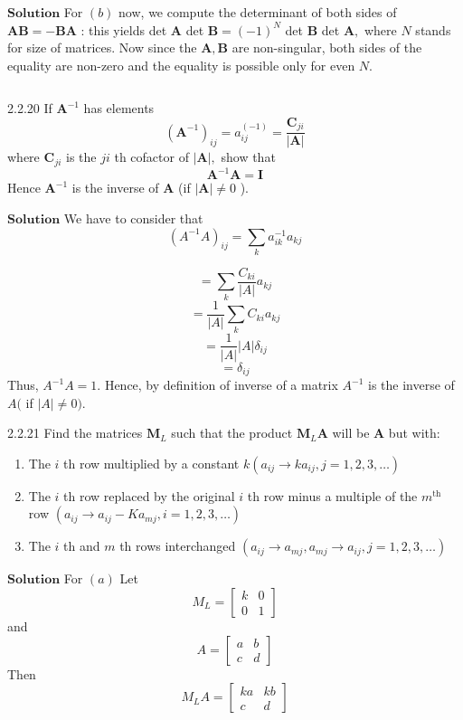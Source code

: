 $\boxed{\textbf{Solution}}$ For $(b)$ now, we compute the determinant of both sides of $\mathbf{A} \mathbf{B}=-\mathbf{B} \mathbf{A}$ : this yields det $\mathbf{A}$ det $\mathbf{B}=(-1)^{N}$ det $\mathbf{B}$ det $\mathbf{A},$ where $N$ stands for size of matrices. Now since the $\mathbf{A}, \mathbf{B}$ are non-singular, both sides of the equality are non-zero and the equality is possible only for even $N .$

$$$$

\begin{mybox}{2.2.20}
If $\mathbf{A}^{-1}$ has elements
$$
\left(\mathbf{A}^{-1}\right)_{i j}=a_{i j}^{(-1)}=\frac{\mathbf{C}_{j i}}{|\mathbf{A}|}
$$
where $\mathbf{C}_{j i}$ is the $j i$ th cofactor of $|\mathbf{A}|,$ show that
$$
\mathbf{A}^{-1} \mathbf{A}=\mathbf{I}
$$
Hence $\mathbf{A}^{-1}$ is the inverse of $\mathbf{A}$ (if $|\mathbf{A}| \neq 0$ ).
\end{mybox}

$\boxed{\textbf{Solution}}$ We have to consider that
$$
\left(A^{-1} A\right)_{i j}=\sum_{k} a_{i k}^{-1} a_{k j}
$$

$$=\sum_{k} \frac{C_{k i}}{|A|} a_{k j}$$
$$=\frac{1}{|A|} \sum_{k} C_{k i} a_{k j}$$
$$=\frac{1}{|A|}|A| \delta_{i j}$$
$$=\delta_{i j}$$
Thus, $A^{-1} A=1$. Hence, by definition of inverse of a matrix $A^{-1}$ is the inverse of $A($ if $|A| \neq 0)$. 






\newpage



\begin{mybox}{2.2.21}
Find the matrices $\mathbf{M}_{L}$ such that the product $\mathbf{M}_{L} \mathbf{A}$ will be $\mathbf{A}$ but with:
\begin{enumerate}[$(a)$]
\item The $i$ th row multiplied by a constant $k\left(a_{i j} \rightarrow k a_{i j}, j=1,2,3, \ldots\right)$
\item The $i$ th row replaced by the original $i$ th row minus a multiple of the $m^{\text{th}}$ row
$\left(a_{i j} \rightarrow a_{i j}-K a_{m j}, i=1,2,3, \ldots\right)$
\item The $i$ th and $m$ th rows interchanged $\left(a_{i j} \rightarrow a_{m j}, a_{m j} \rightarrow a_{i j}, j=1,2,3, \ldots\right)$

\end{enumerate}
\end{mybox}

$\boxed{\textbf{Solution}}$  For $(a)$ Let 
$$M_{L}=\left[\begin{array}{ll}k & 0 \\ 0 & 1\end{array}\right]$$ 
and 
$$A=\left[\begin{array}{ll}a & b \\ c & d\end{array}\right]$$
Then 
$$M_{L} A=\left[\begin{array}{cc}k a & k b \\ c & d\end{array}\right]$$

